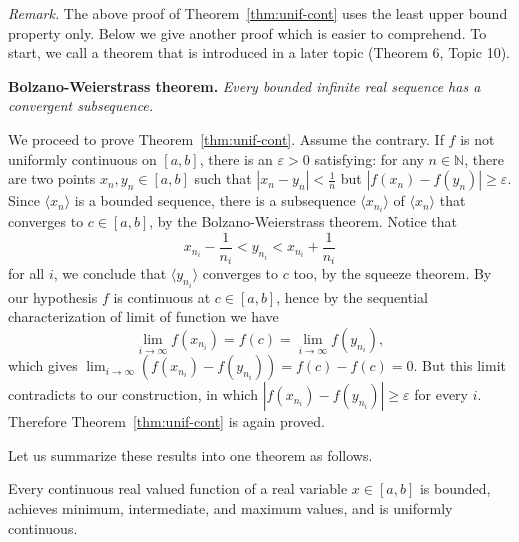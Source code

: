   \textit{Remark.} The above proof of Theorem~\ref{thm:unif-cont} uses the least upper bound property only.  Below we give another proof which is easier to comprehend.  To start, we call a theorem that is introduced in a later topic (Theorem 6, Topic 10).

  \noindent\textbf{Bolzano-Weierstrass theorem.}
  \textit{Every bounded infinite real sequence has a convergent subsequence.}

  We proceed to prove Theorem~\ref{thm:unif-cont}.  Assume the contrary.
  If $f$ is not uniformly continuous on $[a,b]$, there is an $\varepsilon>0$ satisfying: for any $n \in \mathbb{N}$, there are two points $x_n, y_n \in [a,b]$ such that $|x_n - y_n| < \frac1n$ but $|f(x_n) - f(y_n)| \geqslant \varepsilon$.  Since $\langle x_n \rangle$ is a bounded sequence, there is a subsequence $\langle x_{n_i} \rangle$ of $\langle x_n \rangle$ that converges to $c \in [a,b]$, by the Bolzano-Weierstrass theorem.  Notice that
  \[
    x_{n_i} - \frac1{n_i} < y_{n_i} < x_{n_i} + \frac1{n_i}
  \]
  for all $i$, we conclude that $\langle y_{n_i} \rangle$ converges to $c$ too, by the squeeze theorem.
  By our hypothesis $f$ is continuous at $c \in [a,b]$, hence by the sequential characterization of limit of function we have
  \[
    \lim_{i\to\infty} f(x_{n_i}) = f(c) = \lim_{i\to\infty} f(y_{n_i}),
  \]
  which gives $\displaystyle \lim_{i \to \infty} \left( f(x_{n_i}) - f(y_{n_i}) \right) = f(c) - f(c) = 0$.  But this limit contradicts to our construction, in which $|f(x_{n_i}) - f(y_{n_i})| \geqslant \varepsilon$ for every $i$.  Therefore Theorem~\ref{thm:unif-cont} is again proved.

  \medskip
  Let us summarize these results into one theorem as follows.

  \begin{thm}
    Every continuous real valued function of a real variable $x \in [a,b]$ is bounded, achieves minimum, intermediate, and maximum values, and is uniformly continuous.
  \end{thm}

